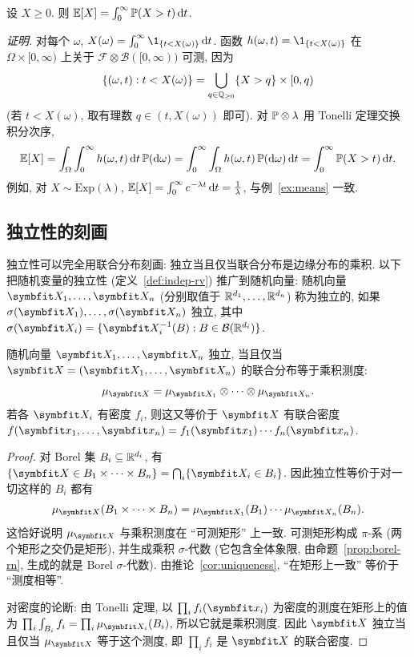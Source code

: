 \begin{example}[期望的尾积分公式]\label{ex:tail-formula}
设 $X\ge0$. 则 $\E[X]=\int_0^\infty\P(X>t)\dd t$.

\emph{证明.} 对每个 $\omega$, $X(\omega)=\int_0^\infty\1_{\{t<X(\omega)\}}\dd t$. 函数 $h(\omega,t)=\1_{\{t<X(\omega)\}}$ 在 $\Omega\times[0,\infty)$ 上关于 $\mathcal{F}\otimes\mathcal{B}([0,\infty))$ 可测, 因为
\[
\{(\omega,t): t<X(\omega)\}=\bigcup_{q\in\Q_{\ge0}}\{X>q\}\times[0,q)
\]
(若 $t<X(\omega)$, 取有理数 $q\in(t,X(\omega))$ 即可). 对 $\P\otimes\lambda$ 用 Tonelli 定理交换积分次序,
\[
\E[X]=\int_\Omega\int_0^\infty h(\omega,t)\dd t\,\P(\dd\omega)=\int_0^\infty\int_\Omega h(\omega,t)\,\P(\dd\omega)\dd t=\int_0^\infty\P(X>t)\dd t.
\]
例如, 对 $X\sim\mathrm{Exp}(\lambda)$, $\E[X]=\int_0^\infty e^{-\lambda t}\dd t=\frac{1}{\lambda}$, 与例~\ref{ex:means} 一致.
\end{example}

\subsection{独立性的刻画}

独立性可以完全用联合分布刻画: 独立当且仅当联合分布是边缘分布的乘积. 以下把随机变量的独立性 (定义~\ref{def:indep-rv}) 推广到随机向量: 随机向量 $\rvec{X}_1,\dots,\rvec{X}_n$ (分别取值于 $\R^{d_1},\dots,\R^{d_n}$) 称为独立的, 如果 $\sigma(\rvec{X}_1),\dots,\sigma(\rvec{X}_n)$ 独立, 其中 $\sigma(\rvec{X}_i)=\{\rvec{X}_i^{-1}(B): B\in\mathcal{B}(\R^{d_i})\}$.

\begin{theorem}[独立性与乘积测度]\label{thm:indep-product-measure}
随机向量 $\rvec{X}_1,\dots,\rvec{X}_n$ 独立, 当且仅当 $\rvec{X}=(\rvec{X}_1,\dots,\rvec{X}_n)$ 的联合分布等于乘积测度:
\[
\mu_{\rvec{X}}=\mu_{\rvec{X}_1}\otimes\cdots\otimes\mu_{\rvec{X}_n}.
\]
若各 $\rvec{X}_i$ 有密度 $f_i$, 则这又等价于 $\rvec{X}$ 有联合密度 $f(\rvec{x}_1,\dots,\rvec{x}_n)=f_1(\rvec{x}_1)\cdots f_n(\rvec{x}_n)$.
\end{theorem}

\begin{proof}
对 Borel 集 $B_i\subseteq\R^{d_i}$, 有 $\{\rvec{X}\in B_1\times\cdots\times B_n\}=\bigcap_i\{\rvec{X}_i\in B_i\}$. 因此独立性等价于对一切这样的 $B_i$ 都有
\[
\mu_{\rvec{X}}(B_1\times\cdots\times B_n)=\mu_{\rvec{X}_1}(B_1)\cdots\mu_{\rvec{X}_n}(B_n).
\]
这恰好说明 $\mu_{\rvec{X}}$ 与乘积测度在 ``可测矩形'' 上一致. 可测矩形构成 $\pi$-系 (两个矩形之交仍是矩形), 并生成乘积 $\sigma$-代数 (它包含全体象限, 由命题~\ref{prop:borel-rn}, 生成的就是 Borel $\sigma$-代数). 由推论~\ref{cor:uniqueness}, ``在矩形上一致'' 等价于 ``测度相等''.

对密度的论断: 由 Tonelli 定理, 以 $\prod_i f_i(\rvec{x}_i)$ 为密度的测度在矩形上的值为 $\prod_i\int_{B_i}f_i=\prod_i\mu_{\rvec{X}_i}(B_i)$, 所以它就是乘积测度. 因此 $\rvec{X}$ 独立当且仅当 $\mu_{\rvec{X}}$ 等于这个测度, 即 $\prod_i f_i$ 是 $\rvec{X}$ 的联合密度.
\end{proof}

